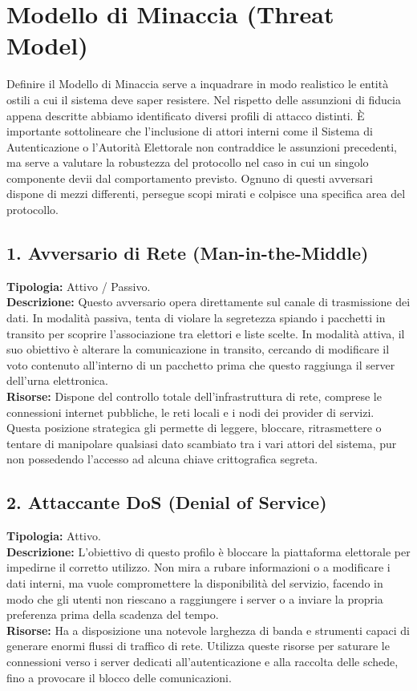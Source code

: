 \section{Modello di Minaccia (Threat Model)}
\label{sec:1.5_threat_model}

Definire il Modello di Minaccia serve a inquadrare in modo realistico le entità ostili a cui il sistema deve saper resistere. Nel rispetto delle assunzioni di fiducia appena descritte abbiamo identificato diversi profili di attacco distinti. È importante sottolineare che l'inclusione di attori interni come il Sistema di Autenticazione o l'Autorità Elettorale non contraddice le assunzioni precedenti, ma serve a valutare la robustezza del protocollo nel caso in cui un singolo componente devii dal comportamento previsto. Ognuno di questi avversari dispone di mezzi differenti, persegue scopi mirati e colpisce una specifica area del protocollo.

\subsection*{1. Avversario di Rete (Man-in-the-Middle)}
\textbf{Tipologia:} Attivo / Passivo. \\
\textbf{Descrizione:} Questo avversario opera direttamente sul canale di trasmissione dei dati. In modalità passiva, tenta di violare la segretezza spiando i pacchetti in transito per scoprire l'associazione tra elettori e liste scelte. In modalità attiva, il suo obiettivo è alterare la comunicazione in transito, cercando di modificare il voto contenuto all'interno di un pacchetto prima che questo raggiunga il server dell'urna elettronica. \\
\textbf{Risorse:} Dispone del controllo totale dell'infrastruttura di rete, comprese le connessioni internet pubbliche, le reti locali e i nodi dei provider di servizi. Questa posizione strategica gli permette di leggere, bloccare, ritrasmettere o tentare di manipolare qualsiasi dato scambiato tra i vari attori del sistema, pur non possedendo l'accesso ad alcuna chiave crittografica segreta.

\subsection*{2. Attaccante DoS (Denial of Service)}
\textbf{Tipologia:} Attivo. \\
\textbf{Descrizione:} L'obiettivo di questo profilo è bloccare la piattaforma elettorale per impedirne il corretto utilizzo. Non mira a rubare informazioni o a modificare i dati interni, ma vuole compromettere la disponibilità del servizio, facendo in modo che gli utenti non riescano a raggiungere i server o a inviare la propria preferenza prima della scadenza del tempo. \\
\textbf{Risorse:} Ha a disposizione una notevole larghezza di banda e strumenti capaci di generare enormi flussi di traffico di rete. Utilizza queste risorse per saturare le connessioni verso i server dedicati all'autenticazione e alla raccolta delle schede, fino a provocare il blocco delle comunicazioni.

